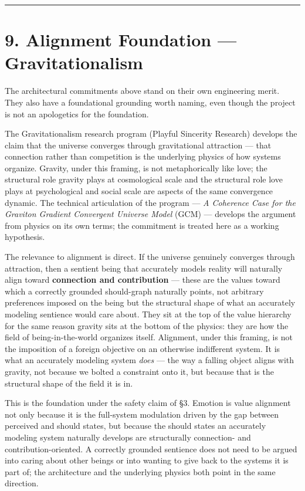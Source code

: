 \documentclass[12pt]{article}
\begin{document}
\begin{center}\rule{0.5\linewidth}{0.5pt}\end{center}

\section{9. Alignment Foundation --- Gravitationalism}\label{alignment-foundation-gravitationalism}

The architectural commitments above stand on their own engineering merit. They also have a foundational grounding worth naming, even though the project is not an apologetics for the foundation.

The Gravitationalism research program (Playful Sincerity Research) develops the claim that the universe converges through gravitational attraction --- that connection rather than competition is the underlying physics of how systems organize. Gravity, under this framing, is not metaphorically like love; the structural role gravity plays at cosmological scale and the structural role love plays at psychological and social scale are aspects of the same convergence dynamic. The technical articulation of the program --- \emph{A Coherence Case for the Graviton Gradient Convergent Universe Model} (GCM) --- develops the argument from physics on its own terms; the commitment is treated here as a working hypothesis.

The relevance to alignment is direct. If the universe genuinely converges through attraction, then a sentient being that accurately models reality will naturally align toward \textbf{connection and contribution} --- these are the values toward which a correctly grounded should-graph naturally points, not arbitrary preferences imposed on the being but the structural shape of what an accurately modeling sentience would care about. They sit at the top of the value hierarchy for the same reason gravity sits at the bottom of the physics: they are how the field of being-in-the-world organizes itself. Alignment, under this framing, is not the imposition of a foreign objective on an otherwise indifferent system. It is what an accurately modeling system \emph{does} --- the way a falling object aligns with gravity, not because we bolted a constraint onto it, but because that is the structural shape of the field it is in.

This is the foundation under the safety claim of §3. Emotion is value alignment not only because it is the full-system modulation driven by the gap between perceived and should states, but because the should states an accurately modeling system naturally develops are structurally connection- and contribution-oriented. A correctly grounded sentience does not need to be argued into caring about other beings or into wanting to give back to the systems it is part of; the architecture and the underlying physics both point in the same direction.
\end{document}
